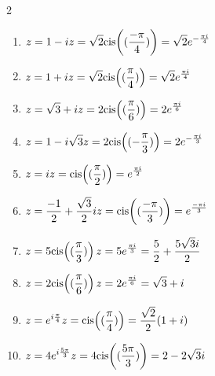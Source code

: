 \begin{solution}
    \text{ }
\begin{multicols}{2}
    \begin{enumerate}[label=(\alph*)]
        \item $\displaystyle z = 1 - i \\ 
        z = \sqrt{2} \mathrm{cis}\!\left((\frac{-\pi}{4})\right) = \sqrt{2} e^{-\frac{\pi i}{4}}$

        \item $\displaystyle z = 1 + i \\
        z = \sqrt{2} \mathrm{cis}\!\left((\frac{\pi}{4})\right) = \sqrt{2} e^{\frac{\pi i}{4}}$
        
        \item $\displaystyle z = \sqrt{3} + i \\
        z = 2 \mathrm{cis}\!\left((\frac{\pi}{6})\right) = 2 e^{\frac{\pi i}{6}}$
        
        \item $\displaystyle z = 1 - i\sqrt3 \\
        z = 2 \mathrm{cis}\!\left((-\frac{\pi}{3})\right) = 2 e^{-\frac{\pi i}{3}}$
        
        \item $\displaystyle z = i \\
        z = \mathrm{cis}\!\left((\frac{\pi}{2})\right) = e^{\frac{\pi i}{2}}$

        \columnbreak
        
        \item $\displaystyle z = \frac{-1}2 + \frac{\sqrt3}2i \\
        z = \mathrm{cis}\!\left((\frac{-\pi}{3})\right) = e^{\frac{-\pi i}{3}}$
        
        \item $\displaystyle z = 5 \mathrm{cis}\!\left((\frac\pi3)\right) \\
        z = 5 e^{\frac{\pi i}{3}} = \frac{5}{2} + \frac{5\sqrt{3}i}{2}$
        
        \item $\displaystyle z = 2 \mathrm{cis}\!\left((\frac\pi6)\right) \\
        z = 2 e^{\frac{\pi i}{6}} = \sqrt{3} + i$
        
        \item $\displaystyle z = e^{i\frac\pi4} \\
        z = \mathrm{cis}\!\left((\frac\pi4)\right) = \frac{\sqrt{2}}{2} (1 + i)$
        
        \item $\displaystyle z = 4e^{i\frac{5\pi}3} \\
        z = 4\mathrm{cis}\!\left((\frac{5\pi}3)\right) = 2 -2\sqrt{3}i$
    \end{enumerate}
    \end{multicols}
\end{solution}

